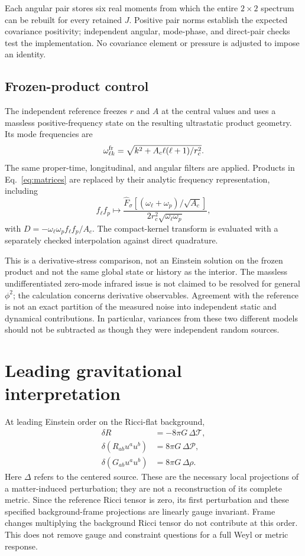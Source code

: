 \documentclass[aps,prd,reprint,floatfix,nofootinbib,longbibliography]{revtex4-2}
\newcommand{\Tr}{\mathcal{T}}
\newcommand{\Pp}{\mathcal{P}}
\begin{document}
Each angular pair stores six real moments from which the entire $2\times2$ spectrum can be rebuilt for every retained $J$. Positive pair norms establish the expected covariance positivity; independent angular, mode-phase, and direct-pair checks test the implementation. No covariance element or pressure is adjusted to impose an identity.

\subsection{Frozen-product control}
The independent reference freezes $r$ and $A$ at the central values and uses a massless positive-frequency state on the resulting ultrastatic product geometry. Its mode frequencies are
\begin{equation}
 \omega_{\ell k}^{\rm fr}=\sqrt{k^2+A_c\ell(\ell+1)/r_c^2}.
\end{equation}
The same proper-time, longitudinal, and angular filters are applied. Products in Eq.~\eqref{eq:matrices} are replaced by their analytic frequency representation, including
\begin{equation}
 f_\ell f_p\longmapsto
 \frac{\widehat F_\sigma[(\omega_\ell+\omega_p)/\sqrt{A_c}]}{2r_c^2\sqrt{\omega_\ell\omega_p}},
 \label{eq:frozen}
\end{equation}
with $D=-\omega_\ell\omega_p f_\ell f_p/A_c$. The compact-kernel transform is evaluated with a separately checked interpolation against direct quadrature.

This is a derivative-stress comparison, not an Einstein solution on the frozen product and not the same global state or history as the interior. The massless undifferentiated zero-mode infrared issue is not claimed to be resolved for general $\phi^2$; the calculation concerns derivative observables. Agreement with the reference is not an exact partition of the measured noise into independent static and dynamical contributions. In particular, variances from these two different models should not be subtracted as though they were independent random sources.

\section{Leading gravitational interpretation}
At leading Einstein order on the Ricci-flat background,
\begin{align}
 \delta R&=-8\pi G\,\Delta\Tr,\nonumber\\
 \delta(R_{ab}u^a u^b)&=8\pi G\,\Delta\Pp,\label{eq:ricci}\\
 \delta(G_{ab}u^a u^b)&=8\pi G\,\Delta\rho.\nonumber
\end{align}
Here $\Delta$ refers to the centered source. These are the necessary local projections of a matter-induced perturbation; they are not a reconstruction of its complete metric. Since the reference Ricci tensor is zero, its first perturbation and these specified background-frame projections are linearly gauge invariant. Frame changes multiplying the background Ricci tensor do not contribute at this order. This does not remove gauge and constraint questions for a full Weyl or metric response.
\end{document}
